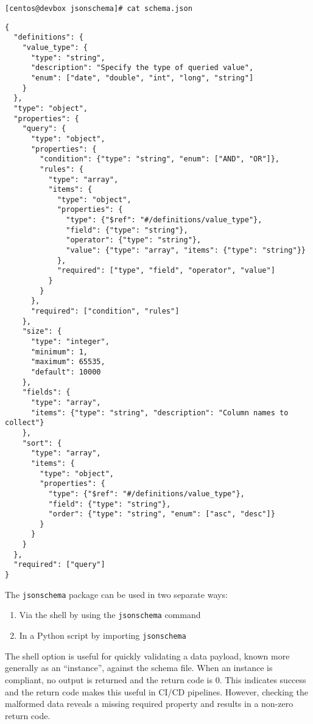 \begin{verbatim}
[centos@devbox jsonschema]# cat schema.json
\end{verbatim}

\begin{verbatim}
{
  "definitions": {
    "value_type": {
      "type": "string",
      "description": "Specify the type of queried value",
      "enum": ["date", "double", "int", "long", "string"]
    }
  },
  "type": "object",
  "properties": {
    "query": {
      "type": "object",
      "properties": {
        "condition": {"type": "string", "enum": ["AND", "OR"]},
        "rules": {
          "type": "array",
          "items": {
            "type": "object",
            "properties": {
              "type": {"$ref": "#/definitions/value_type"},
              "field": {"type": "string"},
              "operator": {"type": "string"},
              "value": {"type": "array", "items": {"type": "string"}}
            },
            "required": ["type", "field", "operator", "value"]
          }
        }
      },
      "required": ["condition", "rules"]
    },
    "size": {
      "type": "integer",
      "minimum": 1,
      "maximum": 65535,
      "default": 10000
    },
    "fields": {
      "type": "array",
      "items": {"type": "string", "description": "Column names to collect"}
    },
    "sort": {
      "type": "array",
      "items": {
        "type": "object",
        "properties": {
          "type": {"$ref": "#/definitions/value_type"},
          "field": {"type": "string"},
          "order": {"type": "string", "enum": ["asc", "desc"]}
        }
      }
    }
  },
  "required": ["query"]
}
\end{verbatim}

The \verb|jsonschema| package can be used in two separate ways:

\begin{enumerate}
  \item Via the shell by using the \verb|jsonschema| command
  \item In a Python script by importing \verb|jsonschema|
\end{enumerate}

The shell option is useful for quickly validating a data payload, known
more generally as an ``instance'', against the schema file. When an instance
is compliant, no output is returned and the return code is 0. This indicates
success and the return code makes this useful in CI/CD pipelines. However,
checking the malformed data reveals a missing required property and results
in a non-zero return code.

